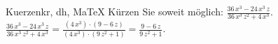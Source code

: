 \begin{MAufgabe}{Kuerzen}{kr, dh, MaTeX}
K\"urzen Sie soweit m\"oglich: $\frac{36\, x^3 - 24\, x^3\, z}{36\, x^3\, z^2 + 4\, x^3}$.\\ 
\ifLsg\MLoesung
\quad $\frac{36\, x^3 - 24\, x^3\, z}{36\, x^3\, z^2 + 4\, x^3}=\frac{(4\, x^3)\cdot(9 - 6\, z)}{(4\, x^3)\cdot(9\, z^2 + 1)}=\frac{9 - 6\, z}{9\, z^2 + 1}$.\else\relax\fi
 \end{MAufgabe}